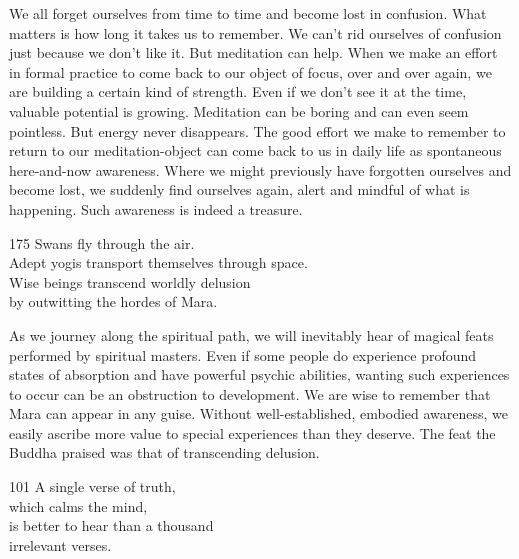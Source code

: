 \begin{dhpRefl}
We all forget ourselves from time to time and become lost in confusion. What matters is how long it takes us to remember. We can't rid ourselves of confusion just because we don't like it. But meditation can help. When we make an effort in formal practice to come back to our object of focus, over and over again, we are building a certain kind of strength. Even if we don't see it at the time, valuable potential is growing. Meditation can be boring and can even seem pointless. But energy never disappears. The good effort we make to remember to return to our meditation-object can come back to us in daily life as spontaneous here-and-now awareness. Where we might previously have forgotten ourselves and become lost, we suddenly find ourselves again, alert and mindful of what is happening. Such awareness is indeed a treasure.
\end{dhpRefl}


\begin{dhpVerse}{175}
\label{dhp-175}
Swans fly through the air.\\
Adept yogis transport themselves through space.\\
Wise beings transcend worldly delusion\\
by outwitting the hordes of Mara.
\end{dhpVerse}

\begin{dhpRefl}
As we journey along the spiritual path, we will inevitably hear of magical feats performed by spiritual masters. Even if some people do experience profound states of absorption and have powerful psychic abilities, wanting such experiences to occur can be an obstruction to development. We are wise to remember that Mara can appear in any guise. Without well-established, embodied awareness, we easily ascribe more value to special experiences than they deserve. The feat the Buddha praised was that of transcending delusion.
\end{dhpRefl}


\begin{dhpVerse}{101}
\label{dhp-101}
A single verse of truth,\\
which calms the mind,\\
is better to hear than a thousand\\
irrelevant verses.
\end{dhpVerse}


